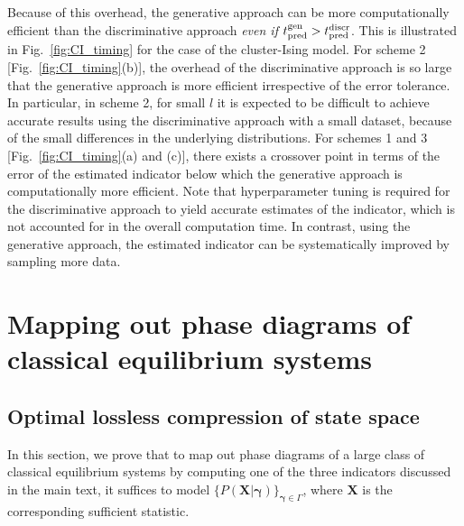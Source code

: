 \documentclass[twocolumn,aps,pra,superscriptaddress,tightlines,nofootinbib]{revtex4-2}
\begin{document}
	Because of this overhead, the generative approach can be more computationally efficient than the discriminative approach \textit{even if} $t_{\rm pred}^{\rm gen} > t_{\rm pred}^{\rm discr}$. This is illustrated in Fig.~\ref{fig:CI_timing} for the case of the cluster-Ising model. For scheme 2 [Fig.~\ref{fig:CI_timing}(b)], the overhead of the discriminative approach is so large that the generative approach is more efficient irrespective of the error tolerance. In particular, in scheme 2, for small $l$ it is expected to be difficult to achieve accurate results using the discriminative approach with a small dataset, because of the small differences in the underlying distributions. For schemes 1 and 3 [Fig.~\ref{fig:CI_timing}(a) and (c)], there exists a crossover point in terms of the error of the estimated indicator below which the generative approach is computationally more efficient. Note that hyperparameter tuning is required for the discriminative approach to yield accurate estimates of the indicator, which is not accounted for in the overall computation time. In contrast, using the generative approach, the estimated indicator can be systematically improved by sampling more data.
	
	\section{Mapping out phase diagrams of classical equilibrium systems}
	\subsection{Optimal lossless compression of state space}
	In this section, we prove that to map out phase diagrams of a large class of classical equilibrium systems by computing one of the three indicators discussed in the main text, it suffices to model $\{ P(\bm{X}|\bm{\gamma})\}_{\bm{\gamma} \in \Gamma}$, where $\bm{X}$ is the corresponding sufficient statistic.
	
\end{document}
